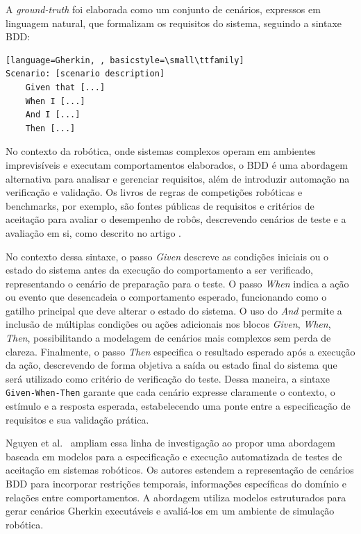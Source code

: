     A \textit{ground-truth} foi elaborada como um conjunto de cenários, expressos em linguagem natural, que formalizam os requisitos do sistema, seguindo a sintaxe BDD:

\begin{lstlisting}[language=Gherkin, , basicstyle=\small\ttfamily]
Scenario: [scenario description]
    Given that [...]
    When I [...]
    And I [...]
    Then [...]
\end{lstlisting} 

No contexto da robótica, onde sistemas complexos operam em ambientes imprevisíveis e executam comportamentos elaborados, o BDD é uma abordagem alternativa para analisar e gerenciar requisitos, além de introduzir automação na verificação e validação. Os livros de regras de competições robóticas e benchmarks, por exemplo, são fontes públicas de requisitos e critérios de aceitação para avaliar o desempenho de robôs, descrevendo cenários de teste e a avaliação em si, como descrito no artigo \cite{BDDStudy}.


No contexto dessa sintaxe, o passo \textit{Given} descreve as condições iniciais ou o estado do sistema antes da execução do comportamento a ser verificado, representando o cenário de preparação para o teste. O passo \textit{When} indica a ação ou evento que desencadeia o comportamento esperado, funcionando como o gatilho principal que deve alterar o estado do sistema. O uso do \textit{And} permite a inclusão de múltiplas condições ou ações adicionais nos blocos \textit{Given}, \textit{When}, \textit{Then}, possibilitando a modelagem de cenários mais complexos sem perda de clareza. Finalmente, o passo \textit{Then} especifica o resultado esperado após a execução da ação, descrevendo de forma objetiva a saída ou estado final do sistema que será utilizado como critério de verificação do teste. Dessa maneira, a sintaxe \texttt{Given-When-Then} garante que cada cenário expresse claramente o contexto, o estímulo e a resposta esperada, estabelecendo uma ponte entre a especificação de requisitos e sua validação prática.

Nguyen et al.~\cite{Nguyen2025BDD} ampliam essa linha de investigação ao propor uma abordagem baseada em modelos para a especificação e execução automatizada de testes de aceitação em sistemas robóticos. Os autores estendem a representação de cenários BDD para incorporar restrições temporais, informações específicas do domínio e relações entre comportamentos. A abordagem utiliza modelos estruturados para gerar cenários Gherkin executáveis e avaliá-los em um ambiente de simulação robótica.

